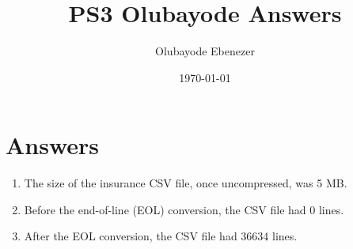 \documentclass{article}
\title{PS3 Olubayode Answers}
\author{Olubayode Ebenezer}
\date{\today}
\begin{document}
\maketitle

\section*{Answers}

\begin{enumerate}
    \item The size of the insurance CSV file, once uncompressed, was 5 MB.
    \item Before the end-of-line (EOL) conversion, the CSV file had 0 lines.
    \item After the EOL conversion, the CSV file had 36634 lines.
\end{enumerate}
\end{document}
